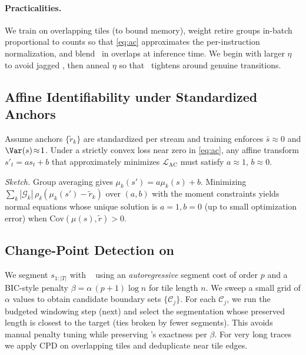 \paragraph{Practicalities.}
We train on overlapping tiles (to bound memory), weight retire groups in-batch proportional to counts so that \eqref{eq:ac} approximates the per-instruction normalization, and blend \pts\ in overlaps at inference time. We begin with larger \(\eta\) to avoid jagged \pts, then anneal \(\eta\) so that \pts\ tightens around genuine transitions.
\subsection{Affine Identifiability under Standardized Anchors}
\label{subsec:identifiability}
Assume anchors \(\{\tilde{r}_k\}\) are standardized per stream and training enforces \(\bar{s}\!\approx\!0\) and \(\Var(s)\!\approx\!1\). Under a strictly convex loss near zero in \eqref{eq:ac}, any affine transform \(s'_t=a s_t+b\) that approximately minimizes \(\mathcal{L}_{\mathrm{AC}}\) must satisfy \(a\!\approx\!1\), \(b\!\approx\!0\).
 
\noindent\emph{Sketch.}
Group averaging gives \(\mu_k(s')=a\mu_k(s)+b\). Minimizing \(\sum_k|\mathcal{G}_k|\,\rho_\delta(\mu_k(s')-\tilde{r}_k)\) over \((a,b)\) with the moment constraints yields normal equations whose unique solution is \(a{=}1,b{=}0\) (up to small optimization error) when \(\mathrm{Cov}(\mu(s),\tilde{r})>0\).
\subsection{Change-Point Detection on \pts}
\label{subsec:cpd}
We segment \(s_{1:|T|}\) with \pelt~\cite{pelt12} using an \emph{autoregressive} segment cost of order \(p\) and a BIC-style penalty \(\beta=\alpha\,(p{+}1)\log n\) for tile length \(n\). We sweep a small grid of \(\alpha\) values to obtain candidate boundary sets \(\{\mathcal{C}_j\}\). For each \(\mathcal{C}_j\), we run the budgeted windowing step (next) and select the segmentation whose preserved length is closest to the target (ties broken by fewer segments). This avoids manual penalty tuning while preserving \pelt’s exactness per \(\beta\). For very long traces we apply CPD on overlapping tiles and deduplicate near tile edges.
